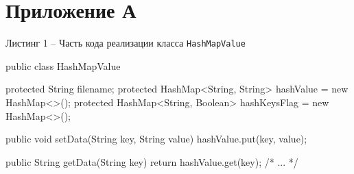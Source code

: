 \documentclass[a4paper,12pt]{article}
\begin{document}
\pagebreak

\printbibliography

\pagebreak

\section*{ \centering Приложение А} 

\begin{center}
Листинг 1 -- Часть кода реализации класса \verb|HashMapValue|
\end{center}


\begin{MyCode}

public class HashMapValue {
	
	protected String filename; 
	protected HashMap<String, String> hashValue = 
	new HashMap<>();
	protected HashMap<String, Boolean> hashKeysFlag =
	 new HashMap<>();
	
	public void setData(String key, String value) {
		hashValue.put(key, value);
	}
	
	public String getData(String key) {
		return hashValue.get(key);
	}
    /* ... */
}
\end{MyCode}
\end{document}
